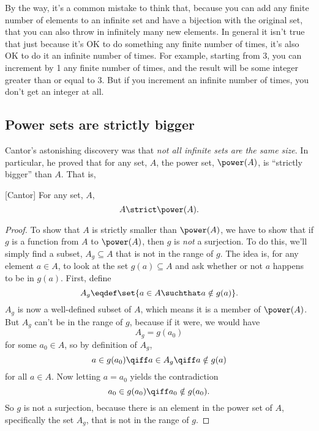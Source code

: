 By the way, it's a common mistake to think that, because you can add
any finite number of elements to an infinite set and have a bijection
with the original set, that you can also throw in infinitely many new
elements.  In general it isn't true that just because it's OK to do
something any finite number of times, it's also OK to do it an infinite
number of times.  For example, starting from 3, you can increment by 1
any finite number of times, and the result will be some integer
greater than or equal to 3.  But if you increment an infinite number
of times, you don't get an integer at all.

\subsection{Power sets are strictly bigger}

Cantor's astonishing discovery was that \emph{not all infinite sets
  are the same size}.  In particular, he proved that for any set, $A$,
the power set, $\power(A)$, is ``strictly bigger'' than
$A$.  That is,
\begin{theorem}\label{powbig}[Cantor]\mbox{}
For any set, $A$,
\[
A \strict \power(A).
\]
\end{theorem}
\begin{proof}
\iffalse
  First of all, $\power(A)$ is as big as $A$: for example, the partial
  function $f:\power(A) \to A$, where $f(\set{a}) \eqdef a$ for $a \in
  A$ and $f$ is only defined on one-element sets, is a surjection.
\fi
 
To show that $A$ is strictly smaller than $\power(A)$, we have to show
that if $g$ is a function from $A$ to $\power(A)$, then $g$ is \emph{not} a
surjection.  To do this, we'll simply find a subset, $A_g \subseteq A$
that is not in the range of $g$.  The idea is, for any element $a \in
A$, to look at the set $g(a) \subseteq A$ and ask whether or not $a$
happens to be in $g(a)$.  First, define \iffalse mimicking Russell's
Paradox,\fi
  \[
  A_g \eqdef \set{a \in A \suchthat a \notin g(a)}.
  \]
  $A_g$ is now a well-defined subset of $A$, which means it is a
  member of $\power(A)$.  But $A_g$ can't be in the range of $g$,
  because if it were, we would have
\[
A_g = g(a_0)
\]
for some $a_0 \in A$, so by definition of $A_g$,
\[
a \in g(a_0) \qiff a \in A_g \qiff a \notin g(a)
\]
for all $a \in A$.  Now letting $a = a_0$ yields the contradiction
\[
a_0 \in g(a_0) \qiff a_0 \notin g(a_0).
\]
So $g$ is not a surjection, because there is an element in the power
set of $A$, specifically the set $A_g$, that is not in the range of $g$.
\end{proof}


